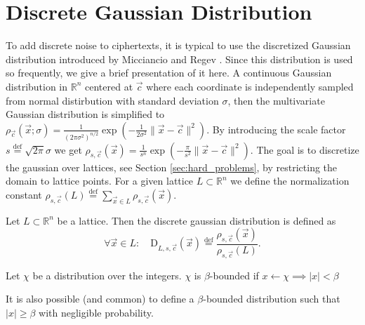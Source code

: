 \section{Discrete Gaussian Distribution}
To add discrete noise to ciphertexts, it is typical to use the discretized Gaussian distribution introduced by Micciancio and Regev \cite{disc-gauss}. Since this distribution is used so frequently, we give a brief presentation of it here. A continuous Gaussian distribution in $\mathbb{R}^n$ centered at $\vec{c}$ where each coordinate is independently sampled from normal distirbution with standard deviation $\sigma$, then the multivariate Gaussian distribution is simplified to $\rho_{\vec{c}}(\vec{x}; \sigma)=\frac{1}{\left(2 \pi \sigma^2\right)^{n / 2}} \exp \left(-\frac{1}{2 \sigma^2} \| \vec{x}-\vec{c} \| ^2\right)$. By introducing the scale factor $s \stackrel{\mathrm{def}}{=} \sqrt{2\pi}\sigma$ we get $\rho_{s, \vec{c}}(\vec{x})=\frac{1}{s^n} \exp \left(-\frac{\pi}{s^2} \| \vec{x}-\vec{c} \| ^2\right)$.
The goal is to discretize the gaussian over lattices, see Section \ref{sec:hard_problems}, by restricting the domain to lattice points. For a given lattice $L \subset \mathbb{R}^n$ we define the normalization constant $\rho_{s, \vec{c}}(L) \stackrel{\mathrm{def}}{=} \sum_{\vec{x} \in L} \rho_{s, \vec{c}}(\vec{x})$.
\begin{definition}\label{Disc-Gauss}
    Let $L \subset \mathbb{R}^n$ be a lattice. Then the discrete gaussian distribution is defined as
    \begin{equation*}
        \forall \vec{x} \in L \colon \quad \textrm{D}_{L, s, \vec{c}}(\vec{x}) \stackrel{\mathrm{def}}{=} \frac{\rho_{s, \vec{c}}(\vec{x})}{\rho_{s, \vec{c}}(L)}.
    \end{equation*}            
\end{definition}
\begin{definition}
    Let $\chi$ be a distribution over the integers. $\chi$ is $\beta$-bounded if $x \leftarrow \chi \implies |x| < \beta$
\end{definition}
\begin{remark}
    It is also possible (and common) to define a $\beta$-bounded distribution such that $|x| \geq \beta$ with negligible probability.
\end{remark}
